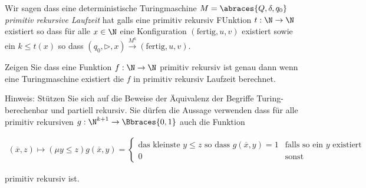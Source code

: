 
\begin{exercise}

Wir sagen dass eine deterministische Turingmaschine $M = \abraces{Q, \delta, q_0}$ \textit{primitiv rekursive Laufzeit} hat galls eine primitiv rekursiv FUnktion $t: \N \to \N$ existiert so dass für alle $x \in \N$ eine Konfiguration $(\mathrm{fertig}, u, v)$ existiert sowie ein $k \leq t(x)$ so dass $(q_0, \triangleright, x) \xrightarrow{M^k} (\mathrm{fertig}, u, v)$.

Zeigen Sie dass eine Funktion $f: \N \to \N$ primitiv rekursiv ist genau dann wenn eine Turingmaschine existiert die $f$ in primitiv rekursiv Laufzeit berechnet.

\begin{itshape}

    Hinweis:
    Stützen Sie sich auf die Beweise  der Äquivalenz  der Begriffe Turing-berechenbar und partiell rekursiv.
    Sie dürfen die Aussage verwenden dass für alle primitiv rekursiven $g: \N^{k+1} \to \Bbraces{0, 1}$ auch die Funktion

    \begin{align*}
        (\overline x, z)
        \mapsto
        (\mu y \leq z) g(\overline x, y)
        =
        \begin{cases}
            \text{das kleinste $y \leq z$ so dass $g(\overline x, y) = 1$}
            & \text{falls so ein $y$ existiert} \\
            0
            & \text{sonst}
        \end{cases}
    \end{align*}

    primitiv rekursiv ist.

\end{itshape}

\end{exercise}


\begin{solution}

\phantom{}

\end{solution}

